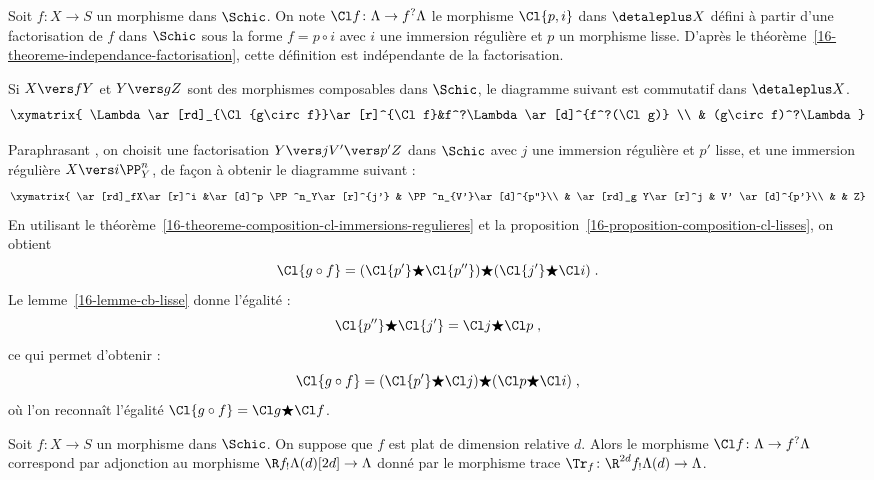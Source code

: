\documentclass[10pt]{../fichiers-configuration-latex/smfart}
\begin{document}
\bigskip

\begin{definition2}\label{16-definition-cl-f-lissifiable}
Soit $f\colon X\to S$ un morphisme dans $\Schic$.
On note $\Cl f\colon
\Lambda\to f^?\Lambda$ le morphisme $\Cl {p,i}$ dans $\detaleplus X$ défini à
partir d'une factorisation de $f$ dans $\Schic$
sous la forme $f=p\circ i$ avec $i$ une
immersion régulière et $p$ un morphisme lisse. D'après le 
théorème~\ref{16-theoreme-independance-factorisation}, cette définition est
indépendante de la factorisation.
\end{definition2}

\begin{theoreme2}\label{16-theoreme-cl-f-transitivite}
Si $X\vers f Y$ et $Y\vers g Z$ sont des morphismes composables dans
$\Schic$, le diagramme suivant est commutatif dans $\detaleplus X$.
\[
\xymatrix{
\Lambda\ar[rd]_{\Cl {g\circ f}}\ar[r]^{\Cl f}&f^?\Lambda\ar[d]^{f^?(\Cl g)} \\
& (g\circ f)^?\Lambda }
\]
\end{theoreme2}

Paraphrasant , on choisit une factorisation $Y\vers j
V'\vers p' Z$ dans $\Schic$ avec $j$ une immersion régulière et $p'$ lisse,
et une immersion régulière $X\vers i \PP^n_Y$, de façon à obtenir le
diagramme suivant :
\[
\xymatrix{
\ar[rd]_fX\ar[r]^i &\ar[d]^p \PP^n_Y\ar[r]^{j'} & \PP^n_{V'}\ar[d]^{p''}\\
& \ar[rd]_g Y\ar[r]^j & V' \ar[d]^{p'}\\
& & Z}
\]
En utilisant le
théorème~\ref{16-theoreme-composition-cl-immersions-regulieres} et la
proposition~\ref{16-proposition-composition-cl-lisses}, on obtient
\[\Cl{g\circ f} = (\Cl{p'}\bigstar\Cl{p''})\bigstar (\Cl {j'}\bigstar \Cl
i)
\;\text{.}\]
Le lemme~\ref{16-lemme-cb-lisse} donne l'égalité :
\[\Cl{p''}\bigstar \Cl {j'}=\Cl j\bigstar\Cl p\;\text{,}\]
ce qui permet d'obtenir :
\[\Cl {g\circ f}=(\Cl{p'}\bigstar \Cl j)\bigstar(\Cl p\bigstar \Cl i)
\;\text{,}\]
où l'on reconnaît l'égalité $\Cl {g\circ f}=\Cl g\bigstar \Cl f$.

\bigskip

\begin{proposition2}
Soit $f\colon X\to S$ un morphisme dans $\Schic$. On suppose que $f$ est
plat de dimension relative $d$. Alors le morphisme $\Cl f\colon \Lambda
\to f^?\Lambda$ correspond par adjonction au morphisme
$\R f_!\Lambda(d)[2d]\to \Lambda$ donné par le morphisme trace $\Tr_f\colon
\R^{2d}f_!\Lambda(d)\to \Lambda$.
\end{proposition2}
\end{document}
